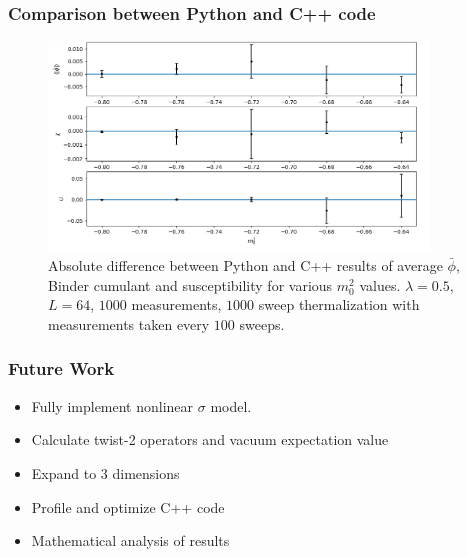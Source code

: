 \documentclass{beamer}
\begin{document}
\begin{frame}
\frametitle{Comparison between Python and C++ code}
\begin{figure}[h]
  \centering
      \includegraphics[width=0.9\textwidth]{imgs/compare.png}
      \caption{Absolute difference between Python and C++ results of average $\bar\phi$, Binder cumulant and susceptibility for various $m_0^2$ values. $\lambda=0.5$, $L=64$, $1000$ measurements, $1000$ sweep thermalization with measurements taken every $100$ sweeps. }

  \label{fig:flow}
\end{figure}
\end{frame}

\begin{frame}
\frametitle{Future Work}
\begin{itemize}
    \item Fully implement nonlinear $\sigma$ model.
    \item Calculate twist-2 operators and vacuum expectation value
    \item Expand to 3 dimensions
    \item Profile and optimize C++ code
    \item Mathematical analysis of results
\end{itemize}

\end{frame}



\end{document}
